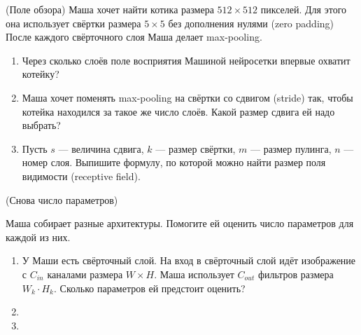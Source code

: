 

\begin{problem}{(Поле обзора)}
    Маша хочет найти котика размера $512 \times 512$ пикселей. Для этого она использует свёртки размера $5 \times 5$ без дополнения нулями (zero padding) После каждого свёрточного слоя Маша делает max-pooling.
    \begin{enumerate}
        \item Через сколько слоёв поле восприятия Машиной нейросетки впервые охватит котейку?
        
        \item Маша хочет поменять max-pooling на свёртки со сдвигом (stride) так, чтобы котейка находился за такое же число слоёв. Какой размер сдвига ей надо выбрать? 
        
        \item Пусть $s$ --- величина сдвига, $k$ --- размер свёртки, $m$ --- размер пулинга, $n$ --- номер слоя. Выпишите формулу, по которой можно найти размер поля видимости (receptive field). %
    \end{enumerate}
\end{problem}


\begin{problem}{(Снова число параметров)}

Маша собирает разные архитектуры. Помогите ей оценить число параметров для каждой из них. 

\begin{enumerate} 
    \item У Маши есть свёрточный слой. На вход в свёрточный слой идёт изображение с $C_{in}$ каналами размера $W \times H$. Маша использует $C_{out}$ фильтров размера $W_k \cdot H_k$. Сколько параметров ей предстоит оценить?
    
    \item 
    
    \item  {}
    
\end{enumerate} 
\end{problem}


